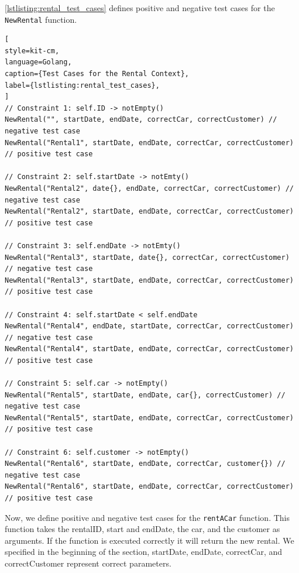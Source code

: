 \autoref{lstlisting:rental_test_cases} defines positive and negative test cases for the \texttt{NewRental} function.
\begin{lstlisting}[
style=kit-cm,
language=Golang,
caption={Test Cases for the Rental Context},
label={lstlisting:rental_test_cases},
]
// Constraint 1: self.ID -> notEmpty()
NewRental("", startDate, endDate, correctCar, correctCustomer) // negative test case
NewRental("Rental1", startDate, endDate, correctCar, correctCustomer) // positive test case

// Constraint 2: self.startDate -> notEmty()
NewRental("Rental2", date{}, endDate, correctCar, correctCustomer) // negative test case
NewRental("Rental2", startDate, endDate, correctCar, correctCustomer) // positive test case

// Constraint 3: self.endDate -> notEmty()
NewRental("Rental3", startDate, date{}, correctCar, correctCustomer) // negative test case
NewRental("Rental3", startDate, endDate, correctCar, correctCustomer) // positive test case

// Constraint 4: self.startDate < self.endDate
NewRental("Rental4", endDate, startDate, correctCar, correctCustomer) // negative test case
NewRental("Rental4", startDate, endDate, correctCar, correctCustomer) // positive test case

// Constraint 5: self.car -> notEmpty()
NewRental("Rental5", startDate, endDate, car{}, correctCustomer) // negative test case
NewRental("Rental5", startDate, endDate, correctCar, correctCustomer) // positive test case

// Constraint 6: self.customer -> notEmpty()
NewRental("Rental6", startDate, endDate, correctCar, customer{}) // negative test case
NewRental("Rental6", startDate, endDate, correctCar, correctCustomer) // positive test case
\end{lstlisting}
  
Now, we define positive and negative test cases for the \texttt{rentACar\(\)} function.
This function takes the rentalID, start and endDate, the car, and the customer as arguments.
If the function is executed correctly it will return the new rental.
We specified in the beginning of the section, startDate, endDate, correctCar, and correctCustomer represent correct parameters.

